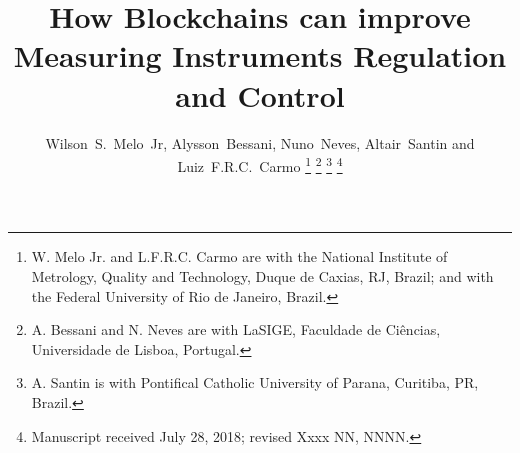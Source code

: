 \documentclass[journal]{IEEEtran}
\begin{document}

\title{How Blockchains can improve Measuring Instruments Regulation and Control}


\author{
\and
{}
\and
{}
}

\author{Wilson~S.~Melo~Jr, %
        Alysson~Bessani, %
        Nuno~Neves, %
        Altair~Santin
        and Luiz~F.R.C.~Carmo
\thanks{W. Melo Jr. and L.F.R.C. Carmo are with the National Institute of Metrology, Quality and Technology, Duque de Caxias, RJ, Brazil; and with the Federal University of Rio de Janeiro, Brazil.}%
\thanks{A. Bessani and N. Neves are with LaSIGE, Faculdade de Ciências, Universidade de Lisboa, Portugal.}%
\thanks{A. Santin is with Pontifical Catholic University of Parana, Curitiba, PR, Brazil.}%
\thanks{Manuscript received July 28, 2018; revised Xxxx NN, NNNN.}}
\end{document}
